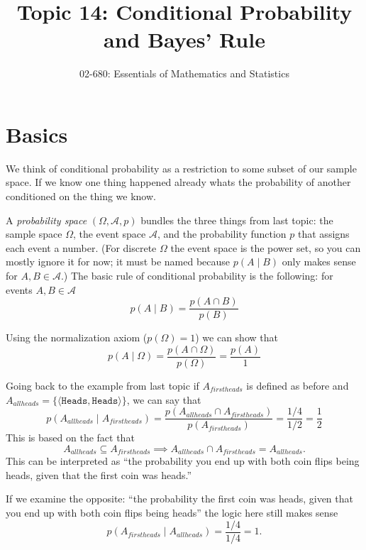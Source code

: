 

\title{Topic 14: Conditional Probability and Bayes' Rule}
\author{02-680: Essentials of Mathematics and Statistics}


\maketitle

\section{Basics}
We think of conditional probability as a restriction to some subset of our sample space. 
If we know one thing happened already whats the probability of another conditioned on the thing we know. 

A \emph{probability space} $(\Omega, \mathcal{A}, p)$ bundles the three things from last topic: the sample space $\Omega$, the event space $\mathcal{A}$, and the probability function $p$ that assigns each event a number. 
(For discrete $\Omega$ the event space is the power set, so you can mostly ignore it for now; it must be named because $p(A\mid B)$ only makes sense for $A,B\in\mathcal{A}$.)
The basic rule of conditional probability is the following: for events $A,B\in\mathcal{A}$
\[p(A\mid B) = \frac{p(A\cap B)}{p(B)}\]

Using the normalization axiom ($p(\Omega)=1$) we can show that 
\[p(A \mid \Omega) = \frac{p(A \cap \Omega)}{p(\Omega)} = \frac{p(A)}{1}\]

Going back to the example from last topic if $A_{firstheads}$ is defined as before and $A_{allheads}=\{\langle\texttt{Heads},\texttt{Heads}\rangle\}$,
we can say that 
\[p(A_{allheads} \mid A_{firstheads}) = \frac{p(A_{allheads} \cap A_{firstheads})}{p(A_{firstheads})} = \frac{1/4}{1/2} = \frac{1}{2}\]
This is based on the fact that \[A_{allheads} \subseteq A_{firstheads} \implies A_{allheads} \cap A_{firstheads} = A_{allheads}.\]
This can be interpreted as ``the probability you end up with both coin flips being heads, given that the first coin was heads.'' 

If we examine the opposite: 
``the probability the first coin was heads, given that you end up with both coin flips being heads'' 
the logic here still makes sense
\[p(A_{firstheads}\mid A_{allheads} ) = \frac{1/4}{1/4} = 1.\]

